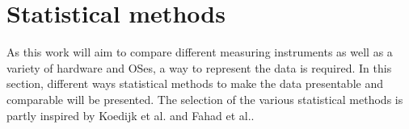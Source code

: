 \section{Statistical methods}\label{sec:stat}

As this work will aim to compare different measuring instruments as well as a variety of hardware and OSes, a way to represent the data is required. In this section, different ways statistical methods to make the data presentable and comparable will be presented. The selection of the various statistical methods is partly inspired by Koedijk et al.\cite{Koedijk2022diff} and Fahad et al.\cite{fahad2019comparative}.



